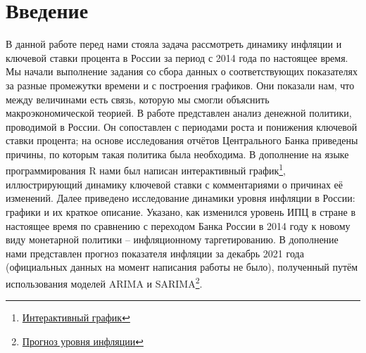 \section{Введение}
\noindent
В данной работе перед нами стояла задача рассмотреть динамику инфляции и ключевой ставки процента в России за период с 2014 года по настоящее время. Мы начали выполнение задания со сбора данных о соответствующих показателях за разные промежутки времени и с построения графиков. Они показали нам, что между величинами есть связь, которую мы смогли объяснить макроэкономической теорией. В работе представлен анализ денежной политики, проводимой в России. Он сопоставлен с периодами роста и понижения ключевой ставки процента; на основе исследования отчётов Центрального Банка приведены причины, по которым такая политика была необходима. В дополнение на языке программирования R нами был написан интерактивный график\footnote{\href{https://cloud.mail.ru/public/Ghzc/5BbkoCXiv/}{Интерактивный график}}, иллюстрирующий динамику ключевой ставки с комментариями о причинах её изменений. Далее приведено исследование динамики уровня инфляции в России: графики и их краткое описание. Указано, как изменился уровень ИПЦ в стране в настоящее время по сравнению с переходом Банка России в 2014 году к новому виду монетарной политики – инфляционному таргетированию. В дополнение нами представлен прогноз показателя инфляции за декабрь 2021 года (официальных данных на момент написания работы не было), полученный путём использования моделей ARIMA и SARIMA\footnote{\href{https://colab.research.google.com/drive/1Ushl61tjySwsZcWbtuyYa8YFMHhyUuRv?usp=sharing}{Прогноз уровня инфляции}}.


\newpage



